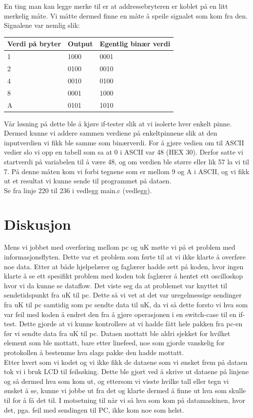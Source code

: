 \documentclass[12pt, a4paper]{report}
\begin{document}
En ting man kan legge merke til er at addressebryteren er koblet på en litt merkelig måte. Vi måtte dermed finne en måte å speile signalet som kom fra den. Signalene var nemlig slik:\\

\begin{center}
    \begin{tabular}{| l | l | l |}
    \hline
    Verdi på bryter & Output & Egentlig binær verdi\\ \hline
    1 & 1000 & 0001 \\ \hline
    2 & 0100 & 0010 \\ \hline
    4 & 0010 & 0100 \\ \hline
    8 & 0001 & 1000 \\ \hline
    A & 0101 & 1010 \\ \hline
    \end{tabular}
\end{center}

Vår løsning på dette ble å kjøre if-tester slik at vi isolerte hver enkelt pinne. Dermed kunne vi addere sammen verdiene på enkeltpinnene slik at den inputverdien vi fikk ble samme som binærverdi. For å gjøre vedien om til ASCII vedier slo vi opp en tabell som sa at 0 i ASCII var 48 (HEX 30). Derfor satte vi startverdi på variabelen til å være 48, og om verdien ble større eller lik 57 la vi til 7. På denne måten kom vi forbi tegnene som er mellom 9 og A i ASCII, og vi fikk ut et resultat vi kunne sende til programmet på dataen.\\ Se fra linje 220 til 236 i vedlegg main.c (vedlegg).


\section{Diskusjon}

Mens vi jobbet med overføring mellom pc og uK møtte vi på et problem med informasjonsflyten. Dette var et problem som førte til at vi ikke klarte å overføre noe data. Etter at både hjelpelærer og faglærer hadde sett på koden, hvor ingen klarte å se ett spesifikt problem med koden tok faglærer å hentet ett oscilloskop hvor vi da kunne se dataflow. Det viste seg da at problemet var knyttet til sendetidspunkt fra uK til pc. Dette så vi vet at det var uregelmessige sendinger fra uK til pc samtidig som pc sendte data til uK, da vi så dette forsto vi hva som var feil med koden å endret den fra å gjøre operasjonen i en switch-case til en if-test. Dette gjorde at vi kunne kontrollere at vi hadde fått hele pakken fra pc-en før vi sendte data fra uK til pc. Dataen mottatt ble aldri sjekket for hvilket element som ble mottatt, bare etter linefeed, noe som gjorde vanskelig for protokollen å bestemme hva slags pakke den hadde mottatt.\\
Etter hvert som vi kodet og vi ikke fikk de dataene som vi ønsket frem på dataen tok vi i bruk LCD til feilsøking. Dette ble gjort ved å skrive ut dataene på linjene og så dermed hva som kom ut, og ettersom vi visste hvilke tall eller tegn vi ønsket å se, kunne vi jobbe ut fra det og klarte dermed å finne ut hva som skulle til for å få det til. I motsetning til når vi så hva som kom på datamaskinen, hvor det, pga. feil med sendingen til PC, ikke kom noe som helst.
\end{document}
